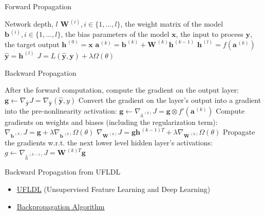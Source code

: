 \documentclass[10pt]{beamer}
\begin{document}
	\begin{frame}{Forward Propagation}
		\begin{algorithm}[H]
			\caption{Forward Propagation}  
			\label{alg:forward-prop}  
			\begin{algorithmic}
				\pause
				\REQUIRE Network depth, $l$
				\pause
				\REQUIRE $\bm{W}^{\,(i)},i\in\{1,\dots,l\}$, the weight matrix of the model
				\pause
				\REQUIRE $\bm{b}^{\,(i)},i\in\{1,\dots,l\}$, the bias parameters of the model
				\pause
				\REQUIRE $\bm{x}$, the input to process
				\pause
				\REQUIRE $\bm{y}$, the target output
				\pause
				\STATE $\bm{h}^{\,(0)}=\bm{x}$
				\pause
					\STATE $\bm{a}^{\,(k)}=\bm{b}^{\,(k)}+\bm{W}^{\,(k)}\bm{h}^{\,(k-1)}$
					\STATE $\bm{h}^{\,(l)}=f(\bm{a}^{\,(k)})$
				\ENDFOR
				\pause
				\STATE $\hat{\bm{y}}=\bm{h}^{\,(l)}$
				\pause
				\STATE $J=L(\hat{\bm{y}},\bm{y})+\lambda\Omega(\theta)$
			\end{algorithmic}  
		\end{algorithm}  
	\end{frame}

	\begin{frame}{Backward Propagation}
		\begin{algorithm}[H]
			\caption{Backward computation}
			\label{alg:backward-prop}
			\begin{algorithmic}
				\pause
				\STATE After the forward computation, compute the gradient on the output layer:
				\STATE $\bm{g}\leftarrow\nabla_{\hat{\bm{y}}}J=\nabla_{\hat{\bm{y}}}(\hat{\bm{y}},y)$
				\pause
				\FOR{$k=l,l-1,\dots,1$}
					\pause
					\STATE Convert the gradient on the layer's output into a gradient into the pre-nonlinearity activation:
					\STATE $\bm{g}\leftarrow\nabla_{\hat{a}^{\,(k)}}J=\bm{g}\otimes f'(\bm{a}^{\,(k)})$
					\pause
					\STATE Compute gradients on weights and biases (including the regularization term):
					\STATE $\nabla_{\bm{b}^{\,(k)}}J=\bm{g}+\lambda\nabla_{\bm{b}^{\,(k)}}\Omega(\theta)$
					\STATE $\nabla_{\bm{W}^{\,(k)}}J=\bm{g}\bm{h}^{\,(k-1)T}+\lambda\nabla_{\bm{W}^{\,(k)}}\Omega(\theta)$
					\pause
					\STATE Propagate the gradients w.r.t. the next lower level hidden layer's activations:
					\STATE $g\leftarrow\nabla_{\hat{h}^{\,(k-1)}}J=\bm{W}^{\,(k)T}\bm{g}$
				\ENDFOR
			\end{algorithmic}
		\end{algorithm}
	\end{frame}

	\begin{frame}{Backward Propagation from UFLDL}
		\begin{itemize}
			\item
			\href{http://ufldl.stanford.edu/wiki/index.php/UFLDL_Tutorial}{\underline{UFLDL}} (Unsupervised Feature Learning and Deep Learning)
			\item\href{http://ufldl.stanford.edu/wiki/index.php/Backpropagation_Algorithm}{\underline{Backpropagation Algorithm}}
		\end{itemize}
	\end{frame}
\end{document}
